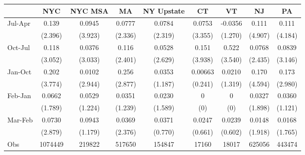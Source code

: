 {
\def\sym#1{\ifmmode^{#1}\else\(^{#1}\)\fi}
\begin{tabular}{l*{8}{c}}
\hline\hline
                    &\multicolumn{1}{c}{NYC}&\multicolumn{1}{c}{NYC MSA}&\multicolumn{1}{c}{MA}&\multicolumn{1}{c}{NY Upstate}&\multicolumn{1}{c}{CT}&\multicolumn{1}{c}{VT}&\multicolumn{1}{c}{NJ}&\multicolumn{1}{c}{PA}\\
\hline
Jul-Apr             &       0.139         &      0.0945         &      0.0777         &      0.0784         &      0.0753         &     -0.0356         &       0.111         &       0.111         \\
                    &     (2.396)         &     (3.923)         &     (2.336)         &     (2.319)         &     (3.355)         &     (1.270)         &     (4.907)         &     (4.184)         \\
[1em]
Oct-Jul             &       0.118         &      0.0376         &       0.116         &      0.0528         &       0.151         &       0.522         &      0.0768         &      0.0839         \\
                    &     (3.052)         &     (3.033)         &     (2.401)         &     (2.629)         &     (3.938)         &     (3.540)         &     (2.435)         &     (3.146)         \\
[1em]
Jan-Oct             &       0.202         &      0.0102         &       0.256         &      0.0353         &     0.00663         &      0.0210         &       0.170         &       0.173         \\
                    &     (3.774)         &     (2.944)         &     (2.877)         &     (1.187)         &     (0.241)         &     (1.319)         &     (4.594)         &     (2.980)         \\
[1em]
Feb-Jan             &      0.0662         &      0.0529         &      0.0351         &      0.0230         &           0         &           0         &      0.0327         &      0.0360         \\
                    &     (1.789)         &     (1.224)         &     (1.239)         &     (1.589)         &         (0)         &         (0)         &     (1.898)         &     (1.121)         \\
[1em]
Mar-Feb             &      0.0730         &      0.0943         &      0.0369         &      0.0371         &      0.0247         &      0.0239         &      0.0148         &      0.0168         \\
                    &     (2.879)         &     (1.179)         &     (2.376)         &     (0.770)         &     (0.661)         &     (0.602)         &     (1.918)         &     (1.765)         \\
\hline
Obs        &     1074449         &      219822         &      517650         &      154847         &       17160         &       18017         &      625056         &      443474         \\
\hline\hline
\end{tabular}
}
